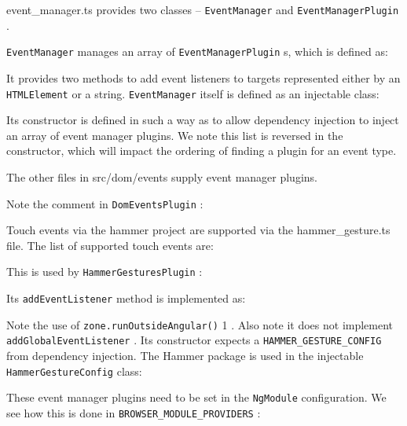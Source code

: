 event\_manager.ts provides two classes –
\texttt{EventManager}
and
\texttt{EventManagerPlugin}
.

\texttt{EventManager}
manages an array of
\texttt{EventManagerPlugin}
s, which is defined as:



It provides two methods to add event listeners to targets represented either by an
\texttt{HTMLElement}
or a string.
\texttt{EventManager}
itself is defined as an injectable class:



Its constructor is defined in such a way as to allow dependency injection to inject an
array of event manager plugins. We note this list is reversed in the constructor, which
will impact the ordering of finding a plugin for an event type.

The other files in src/dom/events supply event manager plugins.

Note the comment in
\texttt{DomEventsPlugin}
:



Touch events via the hammer project are supported via the hammer\_gesture.ts file.
The list of supported touch events are:



This is used by
\texttt{HammerGesturesPlugin}
:



Its
\texttt{addEventListener}
method is implemented as:



Note the use of
\texttt{zone.runOutsideAngular()}
1
. Also note it does not implement
\texttt{addGlobalEventListener}
. Its constructor expects a
\texttt{HAMMER\_GESTURE\_CONFIG}
from
dependency injection. The Hammer package is used in the injectable
\texttt{HammerGestureConfig}
class:



These event manager plugins need to be set in the
\texttt{NgModule}
configuration. We see
how this is done in
\texttt{BROWSER\_MODULE\_PROVIDERS}
:


